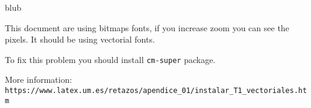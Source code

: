 \documentclass{article}
\begin{document}
blub

This document are using bitmaps fonts, if you increase zoom you can see the pixels. 
It should be using vectorial fonts. 

To fix this problem you should install \texttt{cm-super} package.

More information:\\
\texttt{https://www.latex.um.es/retazos/apendice\_01/instalar\_T1\_vectoriales.htm}
\end{document}
